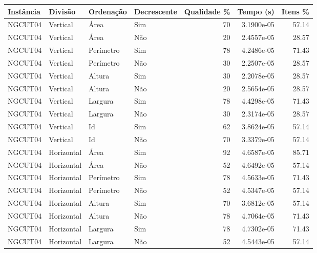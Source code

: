 \begin{tabular}{llllrrr}
    \hline
    Instância & Divisão     & Ordenação & Decrescente & Qualidade \% & Tempo (s)  & Itens \% \\
    \hline
    NGCUT04   & Vertical    & Área      & Sim         & 70           & 3.1900e-05 & 57.14    \\
    NGCUT04   & Vertical    & Área      & Não         & 20           & 2.4557e-05 & 28.57    \\
    NGCUT04   & Vertical    & Perímetro & Sim         & 78           & 4.2486e-05 & 71.43    \\
    NGCUT04   & Vertical    & Perímetro & Não         & 30           & 2.2507e-05 & 28.57    \\
    NGCUT04   & Vertical    & Altura    & Sim         & 30           & 2.2078e-05 & 28.57    \\
    NGCUT04   & Vertical    & Altura    & Não         & 20           & 2.5654e-05 & 28.57    \\
    NGCUT04   & Vertical    & Largura   & Sim         & 78           & 4.4298e-05 & 71.43    \\
    NGCUT04   & Vertical    & Largura   & Não         & 30           & 2.3174e-05 & 28.57    \\
    NGCUT04   & Vertical    & Id        & Sim         & 62           & 3.8624e-05 & 57.14    \\
    NGCUT04   & Vertical    & Id        & Não         & 70           & 3.3379e-05 & 57.14    \\
    NGCUT04   & Horizontal  & Área      & Sim         & 92           & 4.6587e-05 & 85.71    \\
    NGCUT04   & Horizontal  & Área      & Não         & 52           & 4.6492e-05 & 57.14    \\
    NGCUT04   & Horizontal  & Perímetro & Sim         & 78           & 4.5633e-05 & 71.43    \\
    NGCUT04   & Horizontal  & Perímetro & Não         & 52           & 4.5347e-05 & 57.14    \\
    NGCUT04   & Horizontal  & Altura    & Sim         & 70           & 3.6812e-05 & 57.14    \\
    NGCUT04   & Horizontal  & Altura    & Não         & 78           & 4.7064e-05 & 71.43    \\
    NGCUT04   & Horizontal  & Largura   & Sim         & 78           & 4.7302e-05 & 71.43    \\
    NGCUT04   & Horizontal  & Largura   & Não         & 52           & 4.5443e-05 & 57.14    \\

\end{tabular}
